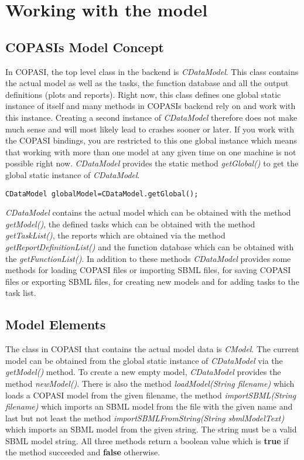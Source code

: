 \documentclass[a4,10pt]{article}
\begin{document}
\section{Working with the model}
\subsection{COPASIs Model Concept}
In COPASI, the top level class in the backend is \textit{CDataModel}. This class contains the actual model as well as the tasks, the function database and all the output definitions (plots and reports). Right now, this class defines one global static instance of itself and many methods in COPASIs backend rely on and work with this instance. Creating a second instance  of \textit{CDataModel} therefore does not make much sense and will most likely lead to crashes sooner or later. If you work with the COPASI bindings, you are restricted to this one global instance which means that working with more than one model at any given time on one machine is not possible right now.
\textit{CDataModel} provides the static method \textit{getGlobal()} to get the global static instance of \textit{CDataModel}.

\begin{lstlisting}
CDataModel globalModel=CDataModel.getGlobal();
\end{lstlisting}

\textit{CDataModel} contains the actual model which can be obtained with the method \textit{getModel()}, the defined tasks which can be obtained with the method \textit{getTaskList()}, the reports which are obtained via the method \textit{getReportDefinitionList()} and the function database which can be obtained with the \textit{getFunctionList()}.
In addition to these methods \textit{CDataModel} provides some methods for loading COPASI files or importing SBML files, for saving COPASI files or exporting SBML files, for creating new models and for adding tasks to the task list.

\subsection{Model Elements}
The class in COPASI that contains the actual model data is \textit{CModel}. The current model can be obtained from the global static instance of \textit{CDataModel} via the \textit{getModel()} method. To create a new empty model, \textit{CDataModel} provides the method \textit{newModel()}. There is also the method \textit{loadModel(String filename)} which loads a COPASI model from the given filename, the method \textit{importSBML(String filename)} which imports an SBML model from the file with the given name and last but not least the method \textit{importSBMLFromString(String sbmlModelText)} which imports an SBML model from the given string. The string must be a valid SBML model string. All three methods return a boolean value which is \textbf{true} if the method succeeded and \textbf{false} otherwise.
\end{document}
